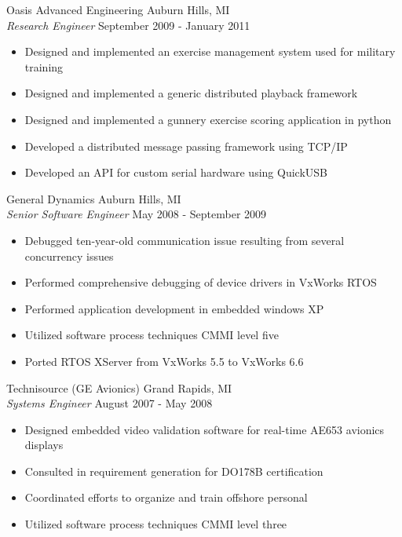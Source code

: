 \documentclass[line]{res}
\begin{document}
\begin{resume}
    \vspace{-2mm}
    Oasis Advanced Engineering \hfill Auburn Hills, MI\\
    {\sl Research Engineer} \hfill September 2009 - January 2011
    \vspace{1mm}
    \begin{itemize}
       \item Designed and implemented an exercise management system used for military training
       \item Designed and implemented a generic distributed playback framework
       \item Designed and implemented a gunnery exercise scoring application in python
       \item Developed a distributed message passing framework using TCP/IP
       \item Developed an API for custom serial hardware using QuickUSB
    \end{itemize}

    \vspace{-2mm}
    General Dynamics \hfill Auburn Hills, MI\\
    {\sl Senior Software Engineer} \hfill May 2008 - September 2009
    \vspace{1mm}
    \begin{itemize}
       \item Debugged ten-year-old communication issue resulting from several concurrency issues
       \item Performed comprehensive debugging of device drivers in VxWorks RTOS
       \item Performed application development in embedded windows XP
       \item Utilized software process techniques CMMI level five
       \item Ported RTOS XServer from VxWorks 5.5 to VxWorks 6.6
    \end{itemize}

    \vspace{-2mm}
    Technisource (GE Avionics) \hfill Grand Rapids, MI\\
    {\sl Systems Engineer} \hfill August 2007 - May 2008
    \vspace{1mm}
    \begin{itemize}
      \item Designed embedded video validation software for real-time AE653 avionics displays
      \item Consulted in requirement generation for DO178B certification
      \item Coordinated efforts to organize and train offshore personal
      \item Utilized software process techniques CMMI level three
    \end{itemize}


\end{resume}
\end{document}
